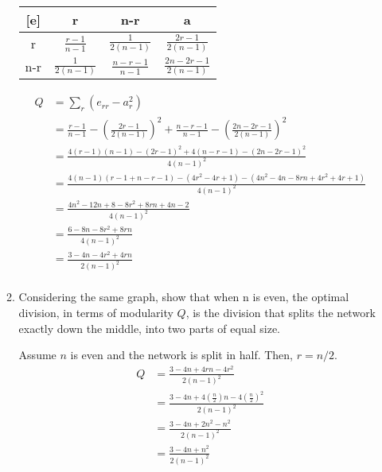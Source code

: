 \documentclass[12pt,letterpaper]{article}
\begin{document}
\begin{enumerate}
\begin{enumerate}
        \begin{center}
            \begin{tabular}{c|c|c||c}
                [e] & r & n-r & a \\
                \hline
                \hline
                r & $\frac{r-1}{n-1}$ & $\frac{1}{2(n-1)}$ & $\frac{2r-1}{2(n-1)}$ \\
                \hline
                n-r & $\frac{1}{2(n-1)}$ & $\frac{n-r-1}{n-1}$ & $\frac{2n-2r-1}{2(n-1)}$
            \end{tabular}
        \end{center}

        \begin{align*}
            Q &= \sum_{r} (e_{rr} - a_r^2) \\
            &= \frac{r-1}{n-1} - \left(\frac{2r-1}{2(n-1)}\right)^2 + \frac{n-r-1}{n-1} - \left(\frac{2n-2r-1}{2(n-1)}\right)^2 \\
            &= \frac{4(r-1)(n-1)-(2r-1)^2+4(n-r-1)-(2n-2r-1)^2}{4(n-1)^2} \\
            &= \frac{4(n-1)(r-1+n-r-1) - (4r^2 -4r +1) - (4n^2 - 4n - 8rn + 4r^2 + 4r + 1)}{4(n-1)^2} \\
            &= \frac{4n^2-12n+8 -8r^2 + 8rn + 4n -2}{4(n-1)^2} \\
            &= \frac{6-8n -8r^2 + 8rn}{4(n-1)^2} \\
            &= \frac{3 -4n -4r^2 + 4rn}{2(n-1)^2} \\
        \end{align*}

        \newpage
        \item Considering the same graph, show that when n is even, the optimal division, in terms of modularity $Q$, is the division that splits the network exactly down the middle, into two parts of equal size.

        Assume $n$ is even and the network is split in half. Then, $r = n/2$.
        \begin{align*}
            Q &= \frac{3 - 4n + 4rn - 4r^{2}}{2(n - 1)^2} \\
            &= \frac{3 - 4n + 4 (\frac{n}{2})n - 4 (\frac{n}{2})^2} {2(n-1)^2} \\
            &= \frac{3 - 4n + 2 n^2 - n^2} {2(n-1)^2} \\
            &= \frac{3 - 4n + n^2} {2(n-1)^2}
         \end{align*}


\end{enumerate}
\end{enumerate}
\end{document}
